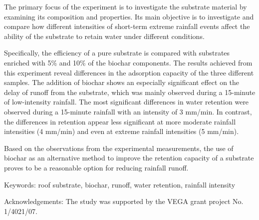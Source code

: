 \noindent

The primary focus of the experiment is to investigate the substrate material by examining its composition and properties. Its main objective is to investigate and compare how different intensities of short-term extreme rainfall events affect the ability of the substrate to retain water under different conditions. 

Specifically, the efficiency of a pure substrate is compared with substrates enriched with 5\% and 10\% of the biochar components. The results achieved from this experiment reveal differences in the adsorption capacity of the three different samples. The addition of biochar shows an especially significant effect on the delay of runoff from the substrate, which was mainly observed during a 15-minute of low-intensity rainfall. The most significant differences in water retention were observed during a 15-minute rainfall with an intensity of 3 mm/min. In contrast, the differences in retention appear less significant at more moderate rainfall intensities (4 mm/min) and even at extreme rainfall intensities (5 mm/min). 

Based on the observations from the experimental measurements, the use of biochar as an alternative method to improve the retention capacity of a substrate proves to be a reasonable option for reducing rainfall runoff.

Keywords: roof substrate, biochar, runoff, water retention, rainfall intensity 

Acknowledgements:
The study was supported by the VEGA grant project No. 1/4021/07.



\newpage{}
{}
\begin{flushleft}





\end{flushleft}


